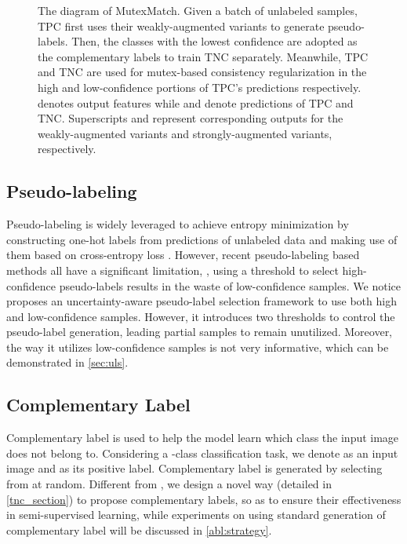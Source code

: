 \documentclass[lettersize,journal]{IEEEtran}
\theoremstyle{plain}
\theoremstyle{definition}
\theoremstyle{remark}
\begin{document}
\begin{figure*}[t]  
\setlength{\abovecaptionskip}{-1em}
   \begin{center}
   \end{center}
\caption{The diagram of MutexMatch. Given a batch of unlabeled samples, 
   TPC  first uses their weakly-augmented variants to generate pseudo-labels. Then,   the classes with the lowest confidence are adopted as the complementary labels to train TNC  separately. 
   Meanwhile, TPC and TNC are used for mutex-based consistency regularization in the high and low-confidence portions of TPC's predictions respectively.  denotes output features while  and  denote predictions of TPC and TNC. Superscripts  and  represent corresponding outputs for the weakly-augmented variants and strongly-augmented variants, respectively.}
   \label{fig1}
\end{figure*}

\subsection{Pseudo-labeling}
Pseudo-labeling is widely leveraged to achieve entropy minimization \cite{grandvalet2004semi} by constructing one-hot labels from predictions of unlabeled data and making use of them based on cross-entropy loss \cite{lee2013pseudo}. However, recent pseudo-labeling based methods \cite{sohn2020fixmatch,li2021comatch} all have a significant limitation, \ie, using a threshold to select high-confidence pseudo-labels results in the waste of low-confidence samples. We notice \cite{rizve2021in} proposes an uncertainty-aware pseudo-label selection framework to use both high and low-confidence samples. 
However, it introduces two thresholds to control the pseudo-label generation, leading partial samples to remain unutilized.
Moreover, 
the way it utilizes low-confidence samples is not very informative, which can be demonstrated in \cref{sec:uls}.

\subsection{Complementary Label}
Complementary label \cite{ishida2017learning,ishida2018complementary,kim2019nlnl,rizve2021in} is used to help the model learn which class the input image does not belong to. Considering a -class classification task, we denote  as an input image and  as its positive label. Complementary label  is generated by selecting from  at random. Different from \cite{kim2019nlnl}, we design a novel way (detailed in \cref{tnc_section}) to propose complementary labels, so as to ensure their effectiveness in semi-supervised learning, while experiments on using standard generation of complementary label will be discussed in \cref{abl:strategy}.
\end{document}
